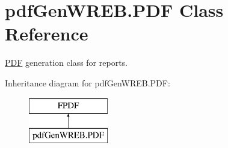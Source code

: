 \hypertarget{classpdf_gen_w_r_e_b_1_1_p_d_f}{}\section{pdf\+Gen\+W\+R\+E\+B.\+P\+DF Class Reference}
\label{classpdf_gen_w_r_e_b_1_1_p_d_f}


\hyperlink{classpdf_gen_w_r_e_b_1_1_p_d_f}{P\+DF} generation class for reports.  


Inheritance diagram for pdf\+Gen\+W\+R\+E\+B.\+P\+DF\+:\begin{figure}[H]
\begin{center}
\leavevmode
\includegraphics[height=2.000000cm]{classpdf_gen_w_r_e_b_1_1_p_d_f}
\end{center}
\end{figure}
